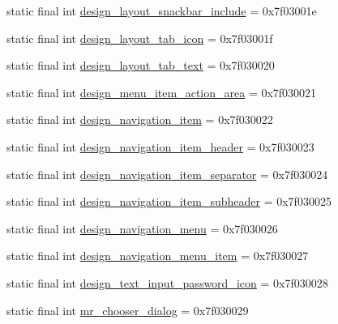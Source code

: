 \begin{CompactItemize}
static final int \hyperlink{classandroid_1_1support_1_1graphics_1_1drawable_1_1animated_1_1_r_1_1layout_d7cbde87d4f7c2413ef8b2a8ac85e1de}{design\_\-layout\_\-snackbar\_\-include} = 0x7f03001e
\item 
static final int \hyperlink{classandroid_1_1support_1_1graphics_1_1drawable_1_1animated_1_1_r_1_1layout_388a65312fd2efce08352e674eeef220}{design\_\-layout\_\-tab\_\-icon} = 0x7f03001f
\item 
static final int \hyperlink{classandroid_1_1support_1_1graphics_1_1drawable_1_1animated_1_1_r_1_1layout_907ff19cc97d3aa6ff0a895a0d301dce}{design\_\-layout\_\-tab\_\-text} = 0x7f030020
\item 
static final int \hyperlink{classandroid_1_1support_1_1graphics_1_1drawable_1_1animated_1_1_r_1_1layout_b5bcf721bb04897c1a6081cce0d0716d}{design\_\-menu\_\-item\_\-action\_\-area} = 0x7f030021
\item 
static final int \hyperlink{classandroid_1_1support_1_1graphics_1_1drawable_1_1animated_1_1_r_1_1layout_d40c0e454806a331b29bf7d0f47b0668}{design\_\-navigation\_\-item} = 0x7f030022
\item 
static final int \hyperlink{classandroid_1_1support_1_1graphics_1_1drawable_1_1animated_1_1_r_1_1layout_4cdefa8fde7fdb6784fbff8b2359fb77}{design\_\-navigation\_\-item\_\-header} = 0x7f030023
\item 
static final int \hyperlink{classandroid_1_1support_1_1graphics_1_1drawable_1_1animated_1_1_r_1_1layout_8a46d21cd7c76e70f1029a95ecc1e930}{design\_\-navigation\_\-item\_\-separator} = 0x7f030024
\item 
static final int \hyperlink{classandroid_1_1support_1_1graphics_1_1drawable_1_1animated_1_1_r_1_1layout_2029b2836fb262bc815951e3ef839521}{design\_\-navigation\_\-item\_\-subheader} = 0x7f030025
\item 
static final int \hyperlink{classandroid_1_1support_1_1graphics_1_1drawable_1_1animated_1_1_r_1_1layout_291cd230e9d399d339012e552ddb2a49}{design\_\-navigation\_\-menu} = 0x7f030026
\item 
static final int \hyperlink{classandroid_1_1support_1_1graphics_1_1drawable_1_1animated_1_1_r_1_1layout_e75f90d44f77f95c9c6921bb1ddc4d92}{design\_\-navigation\_\-menu\_\-item} = 0x7f030027
\item 
static final int \hyperlink{classandroid_1_1support_1_1graphics_1_1drawable_1_1animated_1_1_r_1_1layout_99775eef02fbe5f1199734f6bfa73dd7}{design\_\-text\_\-input\_\-password\_\-icon} = 0x7f030028
\item 
static final int \hyperlink{classandroid_1_1support_1_1graphics_1_1drawable_1_1animated_1_1_r_1_1layout_74bae05498b4987b3c43850de0ed6eac}{mr\_\-chooser\_\-dialog} = 0x7f030029

\end{CompactItemize}
